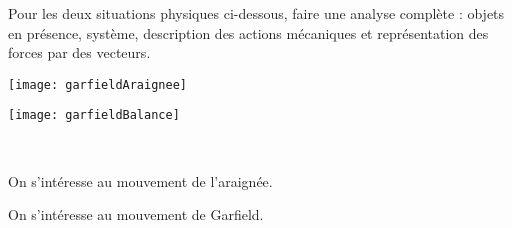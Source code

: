 \begin{activite}[Applications]

Pour les deux situations physiques ci-dessous, faire une analyse complète : objets en présence, système, description des actions mécaniques et représentation des forces par des vecteurs.

\vspace{1em}

\begin{minipage}[c]{.48\linewidth}
\centering%
\texttt{[image: garfieldAraignee]}
\end{minipage}\hfill%
\begin{minipage}[c]{.48\linewidth}
\centering%
\texttt{[image: garfieldBalance]}
\end{minipage}\\[1em]
\begin{minipage}[c]{.48\linewidth}
On s'intéresse au mouvement de l'araignée.
\end{minipage}\hfill%
\begin{minipage}[c]{.48\linewidth}
On s'intéresse au mouvement de Garfield.
\end{minipage}

\end{activite}








